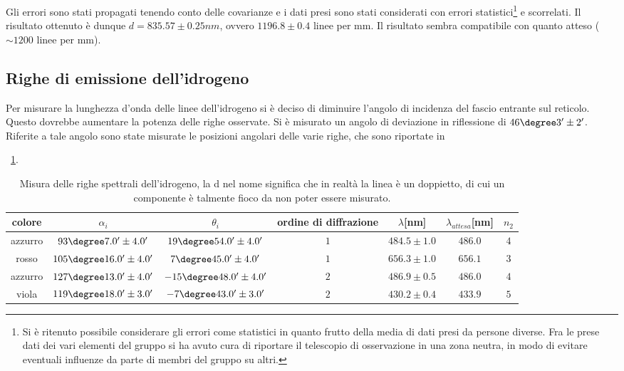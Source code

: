 \documentclass[a4paper,10pt]{article}
\begin{document}
{{{{{{Gli errori sono stati propagati tenendo conto delle covarianze e i dati presi sono stati considerati con errori statistici\footnote{Si è ritenuto possibile considerare gli errori come statistici in quanto frutto della media di dati presi da persone diverse. Fra le prese dati dei vari elementi del gruppo si ha avuto cura di riportare il telescopio di osservazione in una zona neutra, in modo di evitare eventuali influenze da parte di membri del gruppo su altri.} e scorrelati. 
Il risultato ottenuto è dunque $d=835.57 \pm 0.25 nm$, ovvero $1196.8 \pm 0.4$ linee per mm. Il risultato sembra compatibile con quanto atteso ($\sim 1200$ linee per mm).

\subsection{Righe di emissione dell'idrogeno}

Per misurare la lunghezza d'onda delle linee dell'idrogeno si è deciso di diminuire l'angolo di incidenza del fascio entrante sul reticolo. Questo
dovrebbe aumentare la potenza delle righe osservate. Si è misurato un angolo di deviazione in riflessione di $46\degree 3' \pm 2'$. Riferite a tale angolo sono state misurate le posizioni angolari delle varie righe, che sono riportate in \tablename{~\ref{tab:HH}.

\begin{table}[H]
	\centering
	\begin{tabular}{c|c|c|c|c|c|c}
colore & $\alpha_i$ &	$\theta_i$ & ordine di diffrazione & $\lambda$[nm] & $\lambda_{attesa}$[nm]& $n_2$  \\
		\hline
azzurro &  $ 93\degree 7.0' \pm 4.0 ' $  &  $ 19\degree 54.0' \pm 4.0 ' $  &  $ 1 $ & $ 484.5 \pm 1.0 $ & $ 486.0 $ & $ 4 $\\
rosso &  $ 105\degree 16.0' \pm 4.0 ' $  &  $ 7\degree 45.0' \pm 4.0 ' $  &  $ 1 $ & $ 656.3 \pm 1.0 $ & $ 656.1 $ & $ 3 $\\
azzurro &  $ 127\degree 13.0' \pm 4.0 ' $  &  $ -15\degree 48.0' \pm 4.0 ' $  &  $ 2 $ & $ 486.9 \pm 0.5 $ & $ 486.0 $ & $ 4 $\\
viola &  $ 119\degree 18.0' \pm 3.0 ' $  &  $ -7\degree 43.0' \pm 3.0 ' $  &  $ 2 $ & $ 430.2 \pm 0.4 $ & $ 433.9 $ & $ 5 $\\
	\end{tabular}
	\caption{Misura delle righe spettrali dell'idrogeno, la d nel nome significa che in realtà la linea è un doppietto, di cui un componente è talmente fioco da non poter essere misurato. }
	\label{tab:HH}
\end{table}


}}}}}}}
\end{document}
